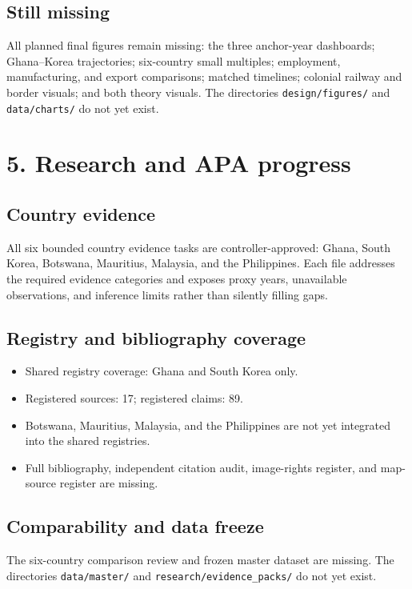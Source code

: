 \documentclass[10pt,a4paper]{article}
\begin{document}
\subsection{Still missing}

All planned final figures remain missing: the three anchor-year dashboards; Ghana--Korea trajectories; six-country small multiples; employment, manufacturing, and export comparisons; matched timelines; colonial railway and border visuals; and both theory visuals. The directories \texttt{design/figures/} and \texttt{data/charts/} do not yet exist.

\section{5. Research and APA progress}

\subsection{Country evidence}

All six bounded country evidence tasks are controller-approved: Ghana, South Korea, Botswana, Mauritius, Malaysia, and the Philippines. Each file addresses the required evidence categories and exposes proxy years, unavailable observations, and inference limits rather than silently filling gaps.

\subsection{Registry and bibliography coverage}

\begin{itemize}
  \item Shared registry coverage: Ghana and South Korea only.
  \item Registered sources: 17; registered claims: 89.
  \item Botswana, Mauritius, Malaysia, and the Philippines are not yet integrated into the shared registries.
  \item Full bibliography, independent citation audit, image-rights register, and map-source register are missing.
\end{itemize}

\subsection{Comparability and data freeze}

The six-country comparison review and frozen master dataset are missing. The directories \texttt{data/master/} and \texttt{research/evidence\_packs/} do not yet exist.
\end{document}

